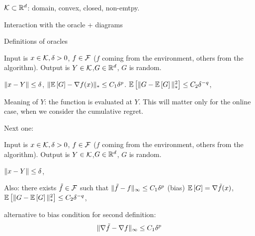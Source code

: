 
$\mathcal{K} \subset \mathbb{R}^d$: domain, convex, closed, non-emtpy.

Interaction with the oracle + diagrams

Definitions of oracles

\begin{definition}
Input is $x\in \mathcal{K},\delta>0$,
$f\in \mathcal{F}$ ($f$ coming from the environment, others from the algorithm).
Output is $Y\in \mathcal{K}$,$G\in \mathbb{R}^d$, $G$ is random.

$\|x-Y\|\le \delta$, 
$\| \mathbb{E}\left[G\right]  - \nabla f(x)  \|_* \le C_1 \delta^p$.
$\mathbb{E}\left[\| G -  \mathbb{E}\left[G\right] \|_*^2\right] \le C_2 \delta^{-q}$,

Meaning of $Y$: the function is evaluated at $Y$. This will matter only for the online case, when we consider the cumulative regret.
\end{definition}

Next one:

\begin{definition}
Input is $x\in \mathcal{K},\delta>0$,
$f\in \mathcal{F}$ ($f$ coming from the environment, others from the algorithm).
Output is $Y\in \mathcal{K}$,$G\in \mathbb{R}^d$, $G$ is random.

$\|x-Y\|\le \delta$, 

Also: there exists $\tilde{f} \in \mathcal{F}$ such that 
$\|\tilde{f}- f\|_\infty \le C_1 \delta^p$ (bias)
$\mathbb{E}\left[G\right]  = \nabla \tilde{f}(x)$,
$\mathbb{E}\left[\| G -  \mathbb{E}\left[G\right] \|_*^2\right] \le C_2 \delta^{-q}$,

\end{definition}

alternative to bias condition for second definition:
\begin{align}
\|\nabla \tilde{f}- \nabla f\|_\infty \le C_1 \delta^p
\end{align}
